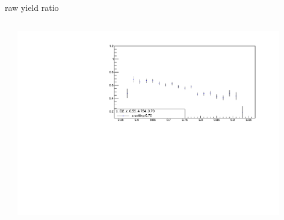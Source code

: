 \begin{frame}{raw yield ratio}
\begin{columns}
\begin{column}[T]{0.5\textwidth}
\end{column}
\begin{column}[T]{0.5\textwidth}
\includegraphics[width = 0.9\textwidth]{results/yield/statistics/x_Q2_z_0.55_4.764_0.70_ratio.pdf}
\end{column}
\end{columns}
\end{frame}
